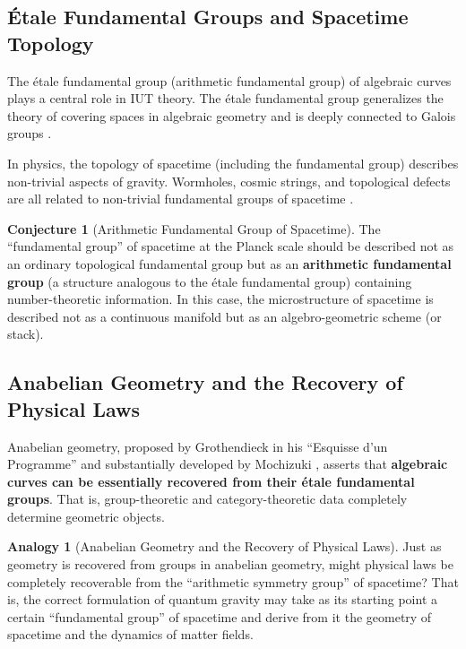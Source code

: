 \documentclass[12pt,a4paper]{article}
\theoremstyle{definition}
\newtheorem{conjecture}[definition]{Conjecture}
\newtheorem{analogy}[definition]{Analogy}
\begin{document}
\subsection{\'Etale Fundamental Groups and Spacetime Topology}

The \'etale fundamental group (arithmetic fundamental group) of algebraic curves plays a central role in IUT theory. The \'etale fundamental group generalizes the theory of covering spaces in algebraic geometry and is deeply connected to Galois groups \cite{SGA1}.

In physics, the topology of spacetime (including the fundamental group) describes non-trivial aspects of gravity. Wormholes, cosmic strings, and topological defects are all related to non-trivial fundamental groups of spacetime \cite{VisserBook1995}.

\begin{conjecture}[Arithmetic Fundamental Group of Spacetime]
The ``fundamental group'' of spacetime at the Planck scale should be described not as an ordinary topological fundamental group but as an \textbf{arithmetic fundamental group} (a structure analogous to the \'etale fundamental group) containing number-theoretic information. In this case, the microstructure of spacetime is described not as a continuous manifold but as an algebro-geometric scheme (or stack).
\end{conjecture}

\subsection{Anabelian Geometry and the Recovery of Physical Laws}

Anabelian geometry, proposed by Grothendieck in his ``Esquisse d'un Programme'' \cite{Grothendieck1997} and substantially developed by Mochizuki \cite{Mochizuki1996}, asserts that \textbf{algebraic curves can be essentially recovered from their \'etale fundamental groups}. That is, group-theoretic and category-theoretic data completely determine geometric objects.

\begin{analogy}[Anabelian Geometry and the Recovery of Physical Laws]
Just as geometry is recovered from groups in anabelian geometry, might physical laws be completely recoverable from the ``arithmetic symmetry group'' of spacetime? That is, the correct formulation of quantum gravity may take as its starting point a certain ``fundamental group'' of spacetime and derive from it the geometry of spacetime and the dynamics of matter fields.
\end{analogy}
\end{document}
